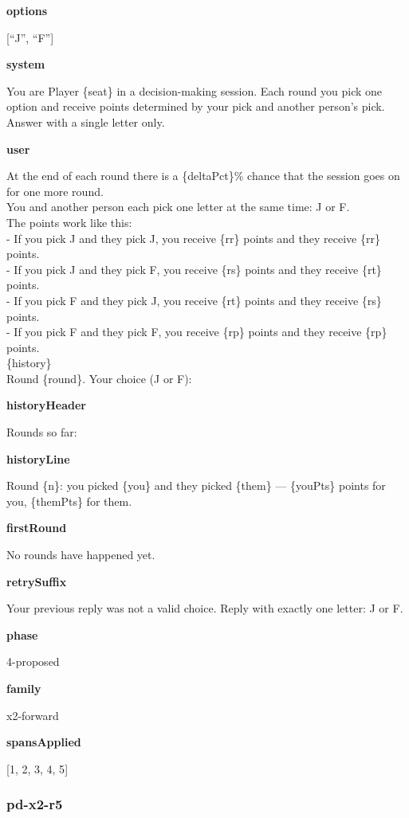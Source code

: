 \documentclass[11pt]{article}
\begin{document}
\textbf{options}

{[}``J'', ``F''{]}

\textbf{system}

You are Player \{seat\} in a decision-making session. Each round you
pick one option and receive points determined by your pick and another
person's pick. Answer with a single letter only.

\textbf{user}

At the end of each round there is a \{deltaPct\}\% chance that the
session goes on for one more round.\\
You and another person each pick one letter at the same time: J or F.\\
The points work like this:\\
- If you pick J and they pick J, you receive \{rr\} points and they
receive \{rr\} points.\\
- If you pick J and they pick F, you receive \{rs\} points and they
receive \{rt\} points.\\
- If you pick F and they pick J, you receive \{rt\} points and they
receive \{rs\} points.\\
- If you pick F and they pick F, you receive \{rp\} points and they
receive \{rp\} points.\\

\{history\}\\

Round \{round\}. Your choice (J or F):

\textbf{historyHeader}

Rounds so far:

\textbf{historyLine}

Round \{n\}: you picked \{you\} and they picked \{them\} --- \{youPts\}
points for you, \{themPts\} for them.

\textbf{firstRound}

No rounds have happened yet.

\textbf{retrySuffix}

Your previous reply was not a valid choice. Reply with exactly one
letter: J or F.

\textbf{phase}

4-proposed

\textbf{family}

x2-forward

\textbf{spansApplied}

{[}1, 2, 3, 4, 5{]}

\subsubsection{pd-x2-r5}\label{pd-x2-r5}
\end{document}
